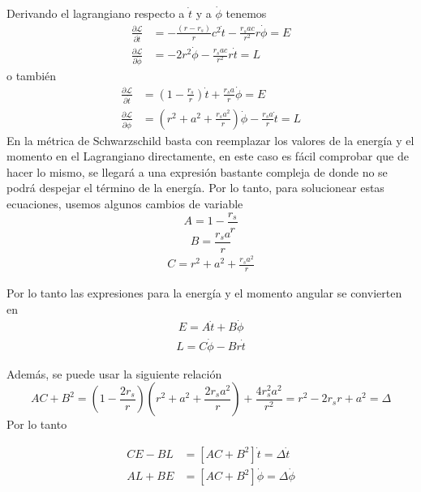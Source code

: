 \documentclass{article}
\begin{document}

Derivando el lagrangiano respecto a $\dot{t}$ y a $\dot{\phi}$ tenemos
\begin{align}
    \frac{\partial\mathcal{L}}{\partial\dot{t}}&=-\frac{(r-r_s)}{r}c^2\dot{t}-\frac{r_sac}{r^2}r\dot{\phi}=E\\
    \frac{\partial\mathcal{L}}{\partial\dot{\phi}}&=-2r^2\dot\phi-\frac{r_sac}{r^2}r\dot{t}=L
\end{align}
o también
\begin{align}
    \frac{\partial\mathcal{L}}{\partial\dot{t}}&=\left(1-\frac{r_s}{r}\right)\dot{t}+\frac{r_sa}{r}\dot{\phi}=E\\
    \frac{\partial\mathcal{L}}{\partial\dot{\phi}}&=\left(r^2+a^2+\frac{r_sa^2}{r}\right)\dot\phi-\frac{r_sa}{r}\dot{t}=L
\end{align}
En la métrica de Schwarzschild basta con reemplazar los valores de la energía y el momento en el Lagrangiano directamente, en este caso es fácil comprobar que de hacer lo mismo, se llegará a una expresión bastante compleja de donde no se podrá despejar el término de la energía. Por lo tanto, para solucionear estas ecuaciones, usemos algunos cambios de variable
$$A=1-\frac{r_s}{r}$$
$$B=\frac{r_sa}{r}$$
\begin{align}\label{20.20}
C=r^2+a^2+\frac{r_sa^2}{r}    
\end{align}

Por lo tanto las expresiones para la energía y el momento angular se convierten en
\begin{align}\label{20.21}
    E= A\dot{t}+B\dot{\phi}
\end{align}
\begin{align}\label{20.22}
    L= C\dot\phi-B{r}\dot{t}
\end{align}

Además, se puede usar la siguiente relación
$$AC+B^2=\left(1-\frac{2r_s}{r}\right)\left(r^2+a^2+\frac{2r_sa^2}{r}\right)+\frac{4r_s^2a^2}{r^2}=r^2-2r_sr+a^2=\Delta$$
Por lo tanto

\begin{align}
    CE -BL &= [AC+B^2]\dot{t} = \Delta\dot{t}\\
    AL + BE &= [AC+B^2]\dot{\phi} = \Delta \dot{\phi}
\end{align}
\end{document}
